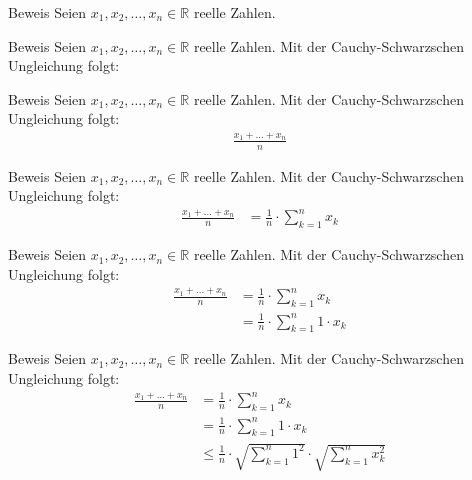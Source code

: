 \documentclass[10pt]{beamer}
\def\bR{\mathbb{R}}
\begin{document}
\begin{frame}{Beweis}
    Seien \( x_{1}, x_{2}, \ldots, x_{n} \in \bR \) reelle Zahlen. 
\end{frame}



\begin{frame}{Beweis}
    Seien \( x_{1}, x_{2}, \ldots, x_{n} \in \bR \) reelle Zahlen. Mit der Cauchy-Schwarzschen Ungleichung folgt: 
\end{frame}



\begin{frame}{Beweis}
    Seien \( x_{1}, x_{2}, \ldots, x_{n} \in \bR \) reelle Zahlen. Mit der Cauchy-Schwarzschen Ungleichung folgt:
    \begin{align*}
        \frac{x_{1} + \ldots + x_{n}}{n}
    \end{align*}
\end{frame}



\begin{frame}{Beweis}
    Seien \( x_{1}, x_{2}, \ldots, x_{n} \in \bR \) reelle Zahlen. Mit der Cauchy-Schwarzschen Ungleichung folgt:
    \begin{align*}
        \frac{x_{1} + \ldots + x_{n}}{n} 
        & = \frac{1}{n} \cdot \sum_{k = 1}^{n} x_{k}
    \end{align*}
\end{frame}



\begin{frame}{Beweis}
    Seien \( x_{1}, x_{2}, \ldots, x_{n} \in \bR \) reelle Zahlen. Mit der Cauchy-Schwarzschen Ungleichung folgt:
    \begin{align*}
        \frac{x_{1} + \ldots + x_{n}}{n} 
        & = \frac{1}{n} \cdot \sum_{k = 1}^{n} x_{k} \\
        & = \frac{1}{n} \cdot \sum_{k = 1}^{n} 1 \cdot x_{k}
    \end{align*}
\end{frame}



\begin{frame}{Beweis}
    Seien \( x_{1}, x_{2}, \ldots, x_{n} \in \bR \) reelle Zahlen. Mit der Cauchy-Schwarzschen Ungleichung folgt:
    \begin{align*}
        \frac{x_{1} + \ldots + x_{n}}{n} 
        & = \frac{1}{n} \cdot \sum_{k = 1}^{n} x_{k} \\
        & = \frac{1}{n} \cdot \sum_{k = 1}^{n} 1 \cdot x_{k} \\
        & \leq \frac{1}{n} \cdot \sqrt{\sum_{k = 1}^{n} 1^{2}} \cdot \sqrt{\sum_{k = 1}^{n} x_{k}^{2}}
    \end{align*}
\end{frame}
\end{document}
